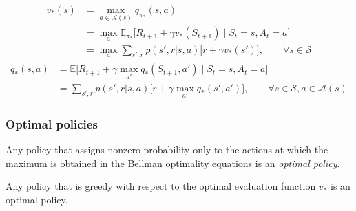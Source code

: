 \begin{equation}
    \begin{aligned}
        v_*(s)
         & =
        \max_{a \in \mathcal{A}(s)} q_{\pi_*}(s, a)
        \\ & =
        \max_{a} \mathbb{E}_{\pi_*} \big[ R_{t+1} + \gamma v_*(S_{t+1}) \;\big|\; S_t = s, A_t = a \big]
        \\ & =
        \max_{a} \sum_{s', r} p(s', r | s, a) \Big[ r + \gamma v_*(s') \Big]
        , \qquad \forall s \in \mathcal{S}
    \end{aligned}
\end{equation}
\begin{equation}
    \begin{aligned}
        q_*(s, a)
         & =
        \mathbb{E} \big[ R_{t+1} + \gamma \max_{a'} q_*(S_{t+1}, a') \;\big|\; S_t = s, A_t = a \big]
        \\ & =
        \sum_{s', r} p(s', r | s, a) \Big[ r + \gamma \max_{a'} q_*(s', a') \Big]
        , \qquad \forall s \in \mathcal{S}, a \in \mathcal{A}(s)
    \end{aligned}
\end{equation}

\subsubsection{Optimal policies}

Any policy that assigns nonzero probability only to the actions at which the maximum is obtained in the Bellman optimality equations is an \textit{optimal policy}.

Any policy that is greedy with respect to the
optimal evaluation function \( v_* \) is an optimal policy.
